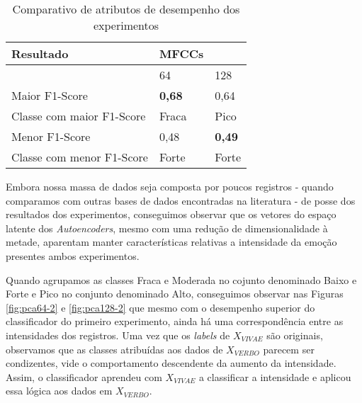 \begin{table}[]
    \centering
    \begin{tabular}{|l|l|l|}
    \hline
        Resultado & MFCCs & ~ \\ \hline
        ~ & 64 & 128 \\ \hline
        Maior F1-Score & \textbf{0,68} & 0,64 \\ \hline
        Classe com maior F1-Score & Fraca & Pico \\ \hline
        Menor F1-Score & 0,48 & \textbf{0,49} \\ \hline
        Classe com menor F1-Score & Forte & Forte \\ \hline
    \end{tabular}
    \caption{\label{table:compexp}Comparativo de atributos de desempenho dos experimentos}
\end{table}

Embora nossa massa de dados seja composta por poucos registros - quando comparamos com outras bases de dados encontradas na literatura - de posse dos resultados dos experimentos, conseguimos observar que os vetores do espaço latente dos \textit{Autoencoders}, mesmo com uma redução de dimensionalidade à metade, aparentam manter características relativas a intensidade da emoção presentes ambos experimentos.

Quando agrupamos as classes Fraca e Moderada no cojunto denominado Baixo e Forte e Pico no conjunto denominado Alto, conseguimos observar nas Figuras \ref{fig:pca64-2} e \ref{fig:pca128-2} que mesmo com o desempenho superior do classificador do primeiro experimento, ainda há uma correspondência entre as intensidades dos registros. Uma vez que os \textit{labels} de $X_{VIVAE}$ são originais, observamos que as classes atribuídas aos dados de $X_{VERBO}$ parecem ser condizentes, vide o comportamento descendente da aumento da intensidade. Assim, o classificador aprendeu com $X_{VIVAE}$ a classificar a intensidade e aplicou essa lógica aos dados em $X_{VERBO}$.
